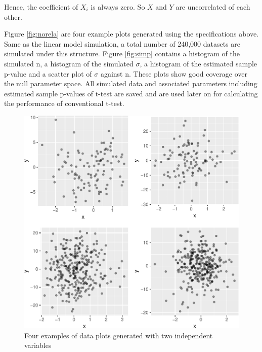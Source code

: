 \documentclass[12pt]{article}
\begin{document}
Hence, the coefficient of \(X_i\) is always zero. So \(X\) and \(Y\) are
uncorrelated of each other.

Figure \ref{fig:norela} are four example plots generated using the
specifications above. Same as the linear model simulation, a total
number of 240,000 datasets are simulated under this structure. Figure
\ref{fig:simp} contains a histogram of the simulated n, a histogram of
the simulated \(\sigma\), a histogram of the estimated sample p-value
and a scatter plot of \(\sigma\) against n. These plots show good
coverage over the null parameter space. All simulated data and
associated parameters including estimated sample p-values of t-test are
saved and are used later on for calculating the performance of
conventional t-test.

\begin{figure}
\centering
\includegraphics{pc_plots_files/figure-latex/norela-1.pdf}
\caption{Four examples of data plots generated with two independent
variables}
\end{figure}
\end{document}
